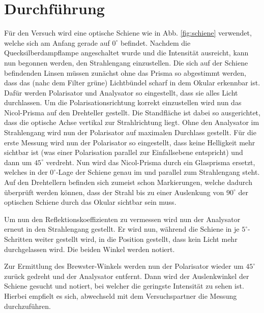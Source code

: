 \documentclass[12pt,a4paper,titlepage,headinclude,bibtotoc]{scrartcl}
\begin{document}
\section{Durchführung}
\label{sec:durchfuehrung}
Für den Versuch wird eine optische Schiene wie in Abb. \ref{fig:schiene} verwendet, welche sich am Anfang gerade auf $0^\circ $  befindet.
Nachdem die Quecksilberdampflampe angeschaltet wurde und die Intensität ausreicht, kann nun begonnen werden, den Strahlengang einzustellen.
Die sich auf der Schiene befindenden Linsen müssen zunächst ohne das Prisma so abgestimmt werden, dass das (nahc dem Filter grüne) Lichtbündel scharf in dem Okular erkennbar ist.
Dafür werden Polarisator und Analysator so eingestellt, dass sie alles Licht durchlassen.
Um die Polarisationsrichtung korrekt einzustellen wird nun das Nicol-Prisma auf den Drehteller gestellt.
Die Standfläche ist dabei so ausgerichtet, dass die optische Achse vertikal zur Strahlrichtung liegt.
Ohne den Analysator im Strahlengang wird nun der Polarisator auf maximalen Durchlass gestellt.
Für die erste Messung wird nun der Polarisator so eingestellt, dass keine Helligkeit mehr sichtbar ist (was einer Polarisation parallel zur Einfallsebene entspricht) und dann um $45^\circ$ verdreht.
Nun wird das Nicol-Prisma durch ein Glasprisma ersetzt, welches in der $0^\circ$-Lage der Schiene genau im und parallel zum Strahlengang steht.
Auf den Drehtellern befinden sich zumeist schon Markierungen, welche  dadurch überprüft werden können, dass der Strahl bis zu einer Auslenkung von $90^\circ$ der optischen Schiene durch das Okular sichtbar sein muss.

Um nun den Reflektionskoeffizienten zu vermessen wird nun der Analysator erneut in den Strahlengang gestellt.
Er wird nun, während die Schiene in je $5^\circ$-Schritten weiter gestellt wird, in die Position gestellt, dass kein Licht mehr durchgelassen wird.
Die beiden Winkel werden notiert.

Zur Ermittlung des Brewster-Winkels werden nun der Polarisator wieder um $45^\circ$ zurück gedreht und der Analysator entfernt.
Dann wird der Auslenkwinkel der Schiene gesucht und notiert, bei welcher die geringste Intensität zu sehen ist.
Hierbei empfielt es sich, abwechseld mit dem Versuchspartner die Messung durchzuführen.
\end{document}
